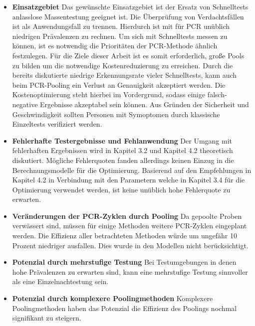 \begin{itemize}
	\item\textbf{Einsatzgebiet}\newline
	Das gewünschte Einsatzgebiet ist der Ersatz von Schnelltests anlasslose Massentestung geeignet ist.
	Die Überprüfung von Verdachtsfällen ist als Anwendungsfall zu trennen.
	Hierdurch ist mit für PCR unüblich niedrigen Prävalenzen zu rechnen.
	Um sich mit Schnelltests messen zu können, ist es notwendig die Prioritäten der PCR-Methode ähnlich festzulegen.
	Für die Ziele dieser Arbeit ist es somit erforderlich, große Pools zu bilden um die notwendige Kostenreduzierung zu erreichen.
	Durch die bereits diskutierte niedrige Erkennungsrate vieler Schnelltests, kann auch beim PCR-Pooling ein Verlust an Genauigkeit akzeptiert werden.
	Die Kostenoptimierung steht hierbei im Vordergrund, sodass einige falsch-negative Ergebnisse akzeptabel sein können.
	Aus Gründen der Sicherheit und Geschwindigkeit sollten Personen mit Symoptomen durch klassische Einzeltests verifiziert werden.
	\item\textbf{Fehlerhafte Testergebnisse und Fehlanwendung}\newline
	Der Umgang mit fehlerhaften Ergebnissen wird in Kapitel 3.2 und Kapitel 4.2 theoretisch diskutiert.
	Mögliche Fehlerquoten fanden allerdings keinen Einzug in die Berechnungsmodelle für die Optimierung.
	Basierend auf den Empfehlungen in Kapitel 4.2 in Verbindung mit den Parametern welche in Kapitel 3.4 für die Optimierung verwendet werden, ist keine unüblich hohe Fehlerquote zu erwarten.
	\item\textbf{Veränderungen der PCR-Zyklen durch Pooling}\newline
	Da gepoolte Proben verwässert sind, müssen für einige Methoden weitere PCR-Zyklen eingeplant werden.
	Die Effizienz aller betrachteten Methoden würde um ungefähr 10 Prozent niedriger ausfallen.
	Dies wurde in den Modellen nicht berücksichtigt.
	\item\textbf{Potenzial durch mehrstufige Testung}\newline
	Bei Testumgebungen in denen hohe Prävalenzen zu erwarten sind, kann eine mehrstufige Testung sinnvoller als eine Einzelnachtestung sein.
	\item\textbf{Potenzial durch komplexere Poolingmethoden}\newline
	Komplexere Poolingmethoden haben das Potenzial die Effizienz des Poolings nochmal signifikant zu steigern.
\end{itemize}
